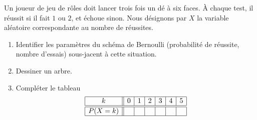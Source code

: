 
\begin{exercice}\label{exosmath-0121}

    Un joueur de jeu de rôles doit lancer trois fois un dé à six faces. À chaque test, il réussit si il fait \( 1\) ou \( 2\), et échoue sinon. Nous désignons par \( X\) la variable aléatoire correspondante au nombre de réussites.
    \begin{enumerate}
        \item
            Identifier les paramètres du schéma de Bernoulli (probabilité de réussite, nombre d'essais) sous-jacent à cette situation.
        \item
            Dessiner un arbre.
        \item
            Compléter le tableau
            \begin{equation*}
                \begin{array}[]{|c||c|c|c|c|c|c|}
                    \hline
                    k&0&1&2&3&4&5\\
                    \hline\hline
                    P(X=k)&&&&&&\\
                    \hline
                \end{array}
            \end{equation*}
    \end{enumerate}


\end{exercice}
